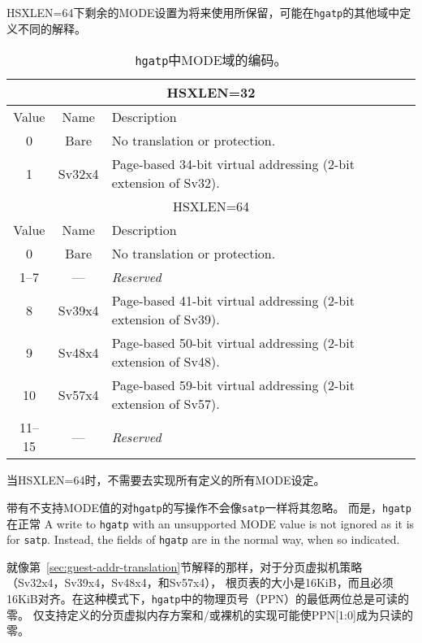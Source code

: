 HSXLEN=64下剩余的MODE设置为将来使用所保留，可能在{\tt hgatp}的其他域中定义不同的解释。

\begin{table}[h]
\begin{center}
\begin{tabular}{|c|c|l|}
\hline
\multicolumn{3}{|c|}{HSXLEN=32} \\
\hline
Value  & Name & Description \\
\hline
0      & Bare   & No translation or protection. \\
1      & Sv32x4 & Page-based 34-bit virtual addressing (2-bit extension of Sv32). \\
\hline \hline
\multicolumn{3}{|c|}{HSXLEN=64} \\
\hline
Value  & Name & Description \\
\hline
0      & Bare   & No translation or protection. \\
1--7   & ---    & {\em Reserved} \\
8      & Sv39x4 & Page-based 41-bit virtual addressing (2-bit extension of Sv39). \\
9      & Sv48x4 & Page-based 50-bit virtual addressing (2-bit extension of Sv48). \\
10     & Sv57x4 & Page-based 59-bit virtual addressing (2-bit extension of Sv57). \\
11--15 & ---    & {\em Reserved} \\
\hline
\end{tabular}
\end{center}
\caption{{\tt hgatp}中MODE域的编码。}
\label{tab:hgatp-mode}
\end{table}

当HSXLEN=64时，不需要去实现所有定义的所有MODE设定。

带有不支持MODE值的对{\tt hgatp}的写操作不会像{\tt satp}一样将其忽略。
而是，{\tt hgatp}在正常
A write to {\tt hgatp} with an unsupported MODE value is not ignored as it is
for {\tt satp}.
Instead, the fields of {\tt hgatp} are {\warl} in the normal way, when so
indicated.

就像第~\ref{sec:guest-addr-translation}节解释的那样，对于分页虚拟机策略（Sv32x4，Sv39x4，Sv48x4，和Sv57x4），
根页表的大小是16KiB，而且必须16KiB对齐。在这种模式下，{\tt hgatp}中的物理页号（PPN）的最低两位总是可读的零。
仅支持定义的分页虚拟内存方案和/或裸机的实现可能使PPN[1:0]成为只读的零。

